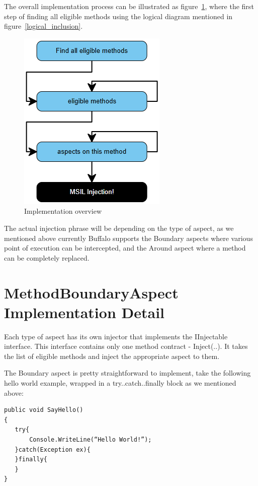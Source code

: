 The overall implementation process can be illustrated as figure~\ref{implementation_overview}, where the first step of finding all eligible methods using the logical diagram mentioned in figure~\ref{logical_inclusion}.

\begin{figure}[here]
  \includegraphics[scale=1.0]{ImplementationOverview3.PNG}
  \centering
  \caption{Implementation overview\label{implementation_overview}}
\end{figure}

The actual injection phrase will be depending on the type of aspect, as we mentioned above currently Buffalo supports the Boundary aspects where various point of execution can be intercepted, and the Around aspect where a method can be completely replaced.

\section{MethodBoundaryAspect Implementation Detail}

Each type of aspect has its own injector that implements the IInjectable interface. This interface contains only one method contract - Inject(..). It takes the list of eligible methods and inject the appropriate aspect to them.

The Boundary aspect is pretty straightforward to implement, take the following hello world example, wrapped in a try..catch..finally block as we mentioned above:

\begin{lstlisting}[caption={SayHello function}, label=sayhello]
public void SayHello()
{
   try{
       Console.WriteLine(“Hello World!”);
   }catch(Exception ex){
   }finally{
   }
}
\end{lstlisting}

